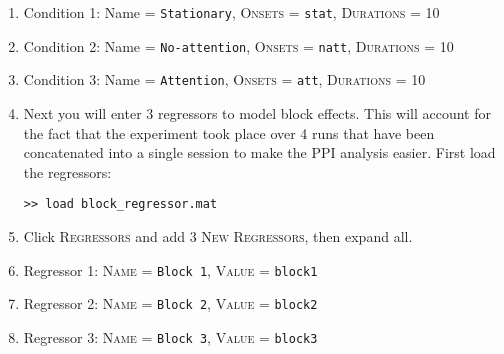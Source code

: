 \begin{enumerate}
\item Condition 1: Name = \texttt{Stationary}, \textsc{Onsets} = \texttt{stat}, \textsc{Durations} = 10
\item Condition 2: Name = \texttt{No-attention}, \textsc{Onsets} = \texttt{natt}, \textsc{Durations} = 10
\item Condition 3: Name = \texttt{Attention}, \textsc{Onsets} = \texttt{att}, \textsc{Durations} = 10
\item Next you will enter 3 regressors to model block effects. This will account for the fact that the experiment took place over 4 runs that have been concatenated into a single session to make the PPI analysis easier. First load the regressors:
\begin{verbatim}
>> load block_regressor.mat
\end{verbatim}
\item Click \textsc{Regressors} and add 3 \textsc{New Regressors}, then expand all.
\item Regressor 1: \textsc{Name} = \texttt{Block 1}, \textsc{Value} = \texttt{block1}
\item Regressor 2: \textsc{Name} = \texttt{Block 2}, \textsc{Value} = \texttt{block2}
\item Regressor 3: \textsc{Name} = \texttt{Block 3}, \textsc{Value} = \texttt{block3}\\\\


\end{enumerate}
